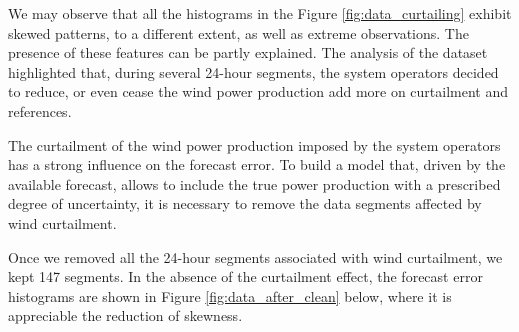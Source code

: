 \documentclass[11pt]{article}
\theoremstyle{definition}
\begin{document}
We may observe that all the histograms in the Figure \ref{fig:data_curtailing} exhibit skewed patterns, to a different extent, as well as extreme observations. The presence of these features can be partly explained. The analysis of the dataset highlighted that, during several 24-hour segments, the system operators decided to reduce, or even cease the wind power production {\color{red} add more on curtailment and references}. 

The curtailment of the wind power production imposed by the system operators has a strong influence on the forecast error. To build a model that, driven by the available forecast, allows to include the true power production with a prescribed degree of uncertainty, it is necessary to remove the data segments affected by wind curtailment.

Once we removed all the 24-hour segments associated with wind curtailment, we kept 147 segments. In the absence of the curtailment effect, the forecast error histograms are shown in Figure \ref{fig:data_after_clean} below, where it is appreciable the reduction of skewness.
\end{document}
